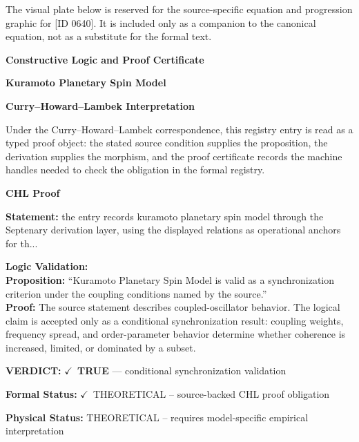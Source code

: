 \begingroup\footnotesize\sloppy
The visual plate below is reserved for the source-specific equation and progression graphic for [ID 0640]. It is included only as a companion to the canonical equation, not as a substitute for the formal text.
\par\endgroup
\ifTZPDarkEdition
{}
\fi

\clearpage
\begingroup\tzpsupportsetup
\noindent\textbf{\fontsize{10.8pt}{12.8pt}\selectfont [ID 0640] Constructive Logic and Proof Certificate}\par
\noindent\textbf{\fontsize{10pt}{12pt}\selectfont Kuramoto Planetary Spin Model}\par
\vspace{0.45em}
\begingroup
\footnotesize
\setlength{\parskip}{0.22em}
\setlength{\parindent}{0pt}
\noindent\textbf{Curry--Howard--Lambek Interpretation}\par
Under the Curry--Howard--Lambek correspondence, this registry entry is read as a typed proof
object: the stated source condition supplies the proposition, the derivation supplies the
morphism, and the proof certificate records the machine handles needed to check the obligation
in the formal registry.

\vspace{0.45em}
\noindent\textbf{CHL Proof}\par
\textbf{Statement:} the entry records kuramoto planetary spin model through the Septenary derivation layer,
using the displayed relations as operational anchors for th...

\textbf{Logic Validation:}\\
\textbf{Proposition:} ``Kuramoto Planetary Spin Model is valid as a synchronization criterion under the coupling
conditions named by the source.''\\
\textbf{Proof:} The source statement describes coupled-oscillator behavior. The logical claim is
accepted only as a conditional synchronization result: coupling weights, frequency
spread, and order-parameter behavior determine whether coherence is increased, limited,
or dominated by a subset.

\textbf{VERDICT:} \ensuremath{\checkmark}\ \textbf{TRUE} --- conditional synchronization validation

\textbf{Formal Status:} \ensuremath{\checkmark}\ THEORETICAL -- source-backed CHL proof obligation

\textbf{Physical Status:} THEORETICAL -- requires model-specific empirical interpretation
\par\vspace{0.45em}
\par
\ifTZPDarkEdition
{}
\fi
\endgroup
\endgroup
